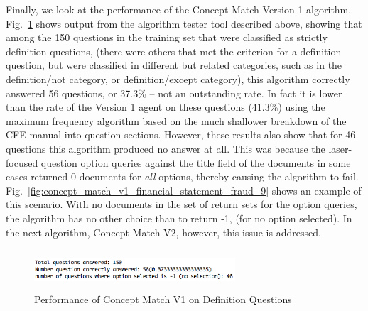 Finally, we look at the performance of the Concept Match Version 1 algorithm.  Fig.~\ref{fig:concept_match_v1_training_set_results_def} shows output from the algorithm tester tool described above, showing that among the 150 questions in the training set that were classified as strictly definition questions, (there were others that met the criterion for a definition question, but were classified in different but related categories, such as in the definition/not category, or definition/except category), this algorithm correctly answered 56 questions, or 37.3\% -- not an outstanding rate.  In fact it is lower than the rate of the Version 1 agent on these questions (41.3\%) using the maximum frequency algorithm based on the much shallower breakdown of the CFE manual into question sections.  However, these results also show that for 46 questions this algorithm produced no answer at all.  This was because the laser-focused question option queries against the title field of the documents in some cases returned 0 documents for \emph{all} options, thereby causing the algorithm to fail.  Fig.~\ref{fig:concept_match_v1_financial_statement_fraud_9} shows an example of this scenario.  With no documents in the set of return sets for the option queries, the algorithm has no other choice than to return -1, (for no option selected).  In the next algorithm, Concept Match V2, however, this issue is addressed.


\begin{figure}
\centering
\vspace{1.0in}
\includegraphics[width=75mm, height=15mm]{concept_match_v1_training_set_results_def.png}
\caption{Performance of Concept Match V1 on Definition Questions}
\label{fig:concept_match_v1_training_set_results_def}
\end{figure}

